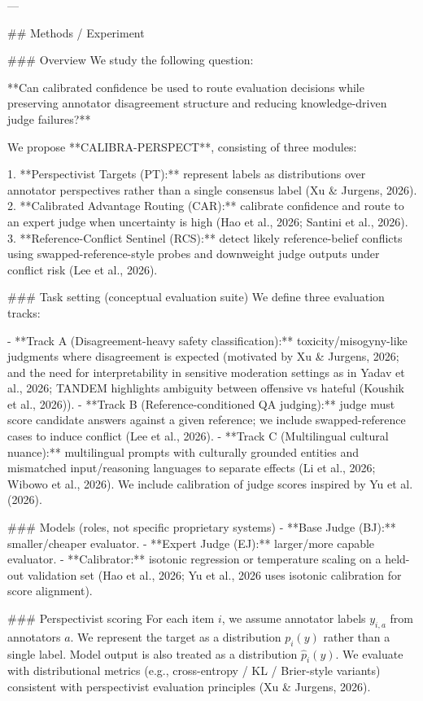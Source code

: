 ---

## Methods / Experiment  

### Overview  
We study the following question:

**Can calibrated confidence be used to route evaluation decisions while preserving annotator disagreement structure and reducing knowledge-driven judge failures?**

We propose **CALIBRA-PERSPECT**, consisting of three modules:

1. **Perspectivist Targets (PT):** represent labels as distributions over annotator perspectives rather than a single consensus label (Xu & Jurgens, 2026).  
2. **Calibrated Advantage Routing (CAR):** calibrate confidence and route to an expert judge when uncertainty is high (Hao et al., 2026; Santini et al., 2026).  
3. **Reference-Conflict Sentinel (RCS):** detect likely reference-belief conflicts using swapped-reference-style probes and downweight judge outputs under conflict risk (Lee et al., 2026).

### Task setting (conceptual evaluation suite)  
We define three evaluation tracks:

- **Track A (Disagreement-heavy safety classification):** toxicity/misogyny-like judgments where disagreement is expected (motivated by Xu & Jurgens, 2026; and the need for interpretability in sensitive moderation settings as in Yadav et al., 2026; TANDEM highlights ambiguity between offensive vs hateful (Koushik et al., 2026)).  
- **Track B (Reference-conditioned QA judging):** judge must score candidate answers against a given reference; we include swapped-reference cases to induce conflict (Lee et al., 2026).  
- **Track C (Multilingual cultural nuance):** multilingual prompts with culturally grounded entities and mismatched input/reasoning languages to separate effects (Li et al., 2026; Wibowo et al., 2026). We include calibration of judge scores inspired by Yu et al. (2026).

### Models (roles, not specific proprietary systems)  
- **Base Judge (BJ):** smaller/cheaper evaluator.  
- **Expert Judge (EJ):** larger/more capable evaluator.  
- **Calibrator:** isotonic regression or temperature scaling on a held-out validation set (Hao et al., 2026; Yu et al., 2026 uses isotonic calibration for score alignment).

### Perspectivist scoring  
For each item \(i\), we assume annotator labels \(y_{i,a}\) from annotators \(a\). We represent the target as a distribution \(p_i(y)\) rather than a single label. Model output is also treated as a distribution \(\hat{p}_i(y)\). We evaluate with distributional metrics (e.g., cross-entropy / KL / Brier-style variants) consistent with perspectivist evaluation principles (Xu & Jurgens, 2026).

